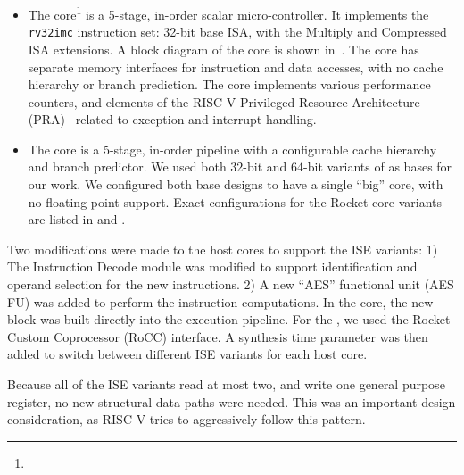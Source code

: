 \begin{itemize}
\item
    The  core\footnote{%
}   is a 5-stage, in-order scalar micro-controller.
    It implements the
    {\tt rv32imc}
    instruction set: 32-bit base ISA, with the Multiply and Compressed
    ISA extensions.
    A block diagram of the core is shown in~.
    The core has separate memory interfaces for instruction and data
    accesses, with no cache hierarchy or branch prediction.
    The core implements various performance counters,
    and
    elements of the
    RISC-V Privileged Resource Architecture 
    (PRA)~\cite[Chapter 3]{RV:ISA:II:17}
    related to exception and interrupt handling.

\item
    The  core\cite{rocket:16} 
    is a 5-stage, in-order pipeline with a configurable cache hierarchy and
    branch predictor.
    We used both $32$-bit and $64$-bit variants of  as bases for
    our work.
    We configured both base designs to have a single ``big'' core, with
    no floating point support.
    Exact configurations for the Rocket core variants are listed in
     and .

\end{itemize}

Two modifications were made to the host cores to support the ISE variants:
1) The Instruction Decode module was modified to support identification and
   operand selection for the new instructions. 
2) A new ``AES'' functional unit (AES FU) was added to perform the instruction
   computations.
In the  core, the new block was built directly into the execution
pipeline.
For the , we used the Rocket Custom Coprocessor (RoCC)
interface.
A synthesis time parameter was then added to switch between different
ISE variants for each host core.

Because all of the ISE variants read at most two,
and write one general purpose register, no new structural data-paths
were needed.
This was an important design consideration, as RISC-V tries to
aggressively follow this pattern.

